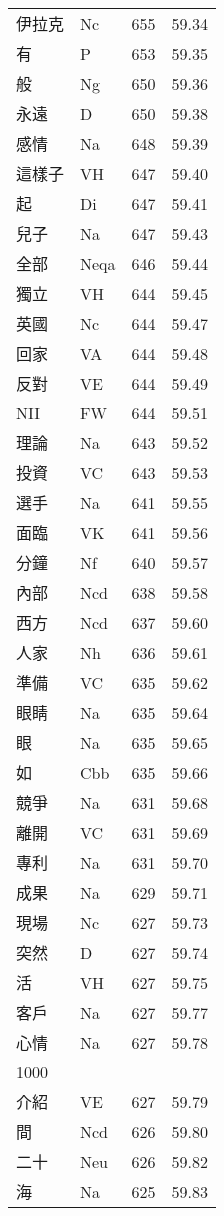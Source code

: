 \documentclass[twocolumn]{book}
\begin{document}
\begin{supertabular}{llrr}
伊拉克 & Nc & 655 &  59.34\\
有 & P & 653 &  59.35\\
般 & Ng & 650 &  59.36\\
永遠 & D & 650 &  59.38\\
感情 & Na & 648 &  59.39\\
這樣子 & VH & 647 &  59.40\\
起 & Di & 647 &  59.41\\
兒子 & Na & 647 &  59.43\\
全部 & Neqa & 646 &  59.44\\
獨立 & VH & 644 &  59.45\\
英國 & Nc & 644 &  59.47\\
回家 & VA & 644 &  59.48\\
反對 & VE & 644 &  59.49\\
NII & FW & 644 &  59.51\\
理論 & Na & 643 &  59.52\\
投資 & VC & 643 &  59.53\\
選手 & Na & 641 &  59.55\\
面臨 & VK & 641 &  59.56\\
分鐘 & Nf & 640 &  59.57\\
內部 & Ncd & 638 &  59.58\\
西方 & Ncd & 637 &  59.60\\
人家 & Nh & 636 &  59.61\\
準備 & VC & 635 &  59.62\\
眼睛 & Na & 635 &  59.64\\
眼 & Na & 635 &  59.65\\
如 & Cbb & 635 &  59.66\\
競爭 & Na & 631 &  59.68\\
離開 & VC & 631 &  59.69\\
專利 & Na & 631 &  59.70\\
成果 & Na & 629 &  59.71\\
現場 & Nc & 627 &  59.73\\
突然 & D & 627 &  59.74\\
活 & VH & 627 &  59.75\\
客戶 & Na & 627 &  59.77\\
心情 & Na & 627 &  59.78\\
1000\\
介紹 & VE & 627 &  59.79\\
間 & Ncd & 626 &  59.80\\
二十 & Neu & 626 &  59.82\\
海 & Na & 625 &  59.83\\

\end{supertabular}
\end{document}
